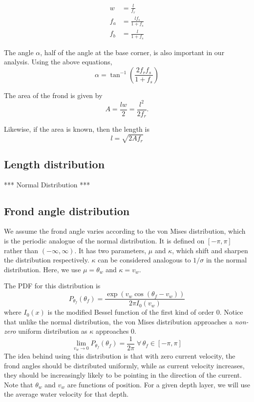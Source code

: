 \begin{align}
	w &= \frac{l}{f_r} \\
	f_a &= \frac{lf_s}{1+f_s} \\
	f_b &= \frac{l}{1+f_s}
\end{align}

The angle $\alpha$, half of the angle at the base corner, is also important in our analysis.
Using the above equations,
\begin{equation}
	\alpha = \tan^{-1}\left(\frac{2f_rf_s}{1+f_s}\right)
\end{equation}

The area of the frond is given by
\begin{equation}
  A = \frac{lw}{2} = \frac{l^2}{2f_r}.
\end{equation}

Likewise, if the area is known, then the length is
\begin{equation}
  l = \sqrt{2Af_r}
  \label{eqn:length-from-area}
\end{equation}

\subsection{Length distribution}

*** Normal Distribution ***
\subsection{Frond angle distribution}
\label{sec:angle_dist}
We assume the frond angle varies according to the von Mises distribution, which is the periodic analogue of the normal distribution.
It is defined on $[-\pi,\pi]$ rather than $(-\infty,\infty)$.
It has two parameters, $\mu$ and $\kappa$, which shift and sharpen the
distribution respectively.
$\kappa$ can be considered analogous to $1/\sigma$ in the normal distribution.
Here, we use $\mu = \theta_w$ and $\kappa = v_w$.

The PDF for this distribution is
\begin{equation}
	P_{\theta_f}(\theta_f) = \frac{\exp\left(v_w\cos(\theta_f-v_w)\right)}{2\pi I_0(v_w)}
\end{equation}
where $I_0(x)$ is the modified Bessel function of the first kind of order 0.
Notice that unlike the normal distribution, the von Mises distribution approaches a \textit{non-zero} uniform distribution as $\kappa$ approaches 0.
\begin{equation}
	\displaystyle \lim_{v_w \to 0}P_{\theta_f}(\theta_f) = \frac{1}{2\pi} \;\forall\, \theta_f \in [-\pi,\pi]
\end{equation}
The idea behind using this distribution is that with zero current velocity, the frond angles should be distributed uniformly, while as current velocity increases, they should be increasingly likely to be pointing in the direction of the current.
Note that $\theta_w$ and $v_w$ are functions of position.
For a given depth layer, we will use the average water velocity for that depth.

